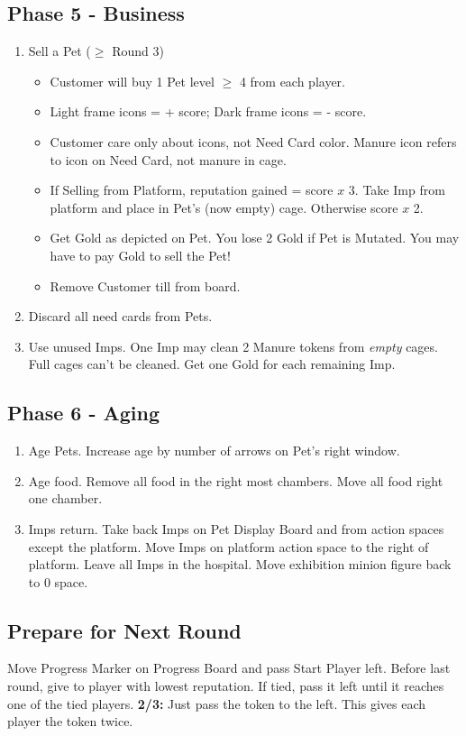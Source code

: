 \documentclass[12pt]{article}
\newenvironment{enumerateCustom}
{\begin{enumerate}
  \setlength{\itemsep}{1pt}
  \setlength{\parskip}{0pt}
  \setlength{\parsep}{0pt}}
{\end{enumerate}}
\newenvironment{itemizeCustom}
{\begin{itemize}
  \setlength{\itemsep}{1pt}
  \setlength{\parskip}{0pt}
  \setlength{\parsep}{0pt}}
{\end{itemize}}
\begin{document}
\begin{multicols*}{2}
\subsection*{Phase 5 - Business}
\begin{enumerateCustom}
	\item Sell a Pet ($\ge$ Round 3)
		\begin{itemizeCustom}
			\item Customer will buy 1 Pet level $\ge$ 4 from each player.
			\item Light frame icons = + score; Dark frame icons = - score.
			\item Customer care only about icons, not Need Card color. Manure icon refers to icon on Need Card, not manure in cage.
			\item If Selling from Platform, reputation gained = score $x$ 3. Take Imp from platform and place in Pet's (now empty) cage. Otherwise score $x$ 2.
			\item Get Gold as depicted on Pet. You lose 2 Gold if Pet is Mutated. You may have to pay Gold to sell the Pet!
			\item Remove Customer till from board.
		\end{itemizeCustom}
	\item Discard all need cards from Pets.
	\item Use unused Imps. One Imp may clean 2 Manure tokens from \emph{empty} cages. Full cages can't be cleaned. Get one Gold for each remaining Imp.
\end{enumerateCustom}

\subsection*{Phase 6 - Aging}
\begin{enumerateCustom}
	\item Age Pets. Increase age by number of arrows on Pet's right window.
	\item Age food. Remove all food in the right most chambers. Move all food right one chamber.
	\item Imps return. Take back Imps on Pet Display Board and from action spaces except the platform. Move Imps on platform action space to the right of platform. Leave all Imps in the hospital. Move exhibition minion figure back to 0 space.
\end{enumerateCustom}

\subsection*{Prepare for Next Round}
Move Progress Marker on Progress Board and pass Start Player left. Before last round, give to player with lowest reputation. If tied, pass it left until it reaches one of the tied players. \textbf{2/3:} Just pass the token to the left. This gives each player the token twice.


\end{multicols*}
\end{document}
